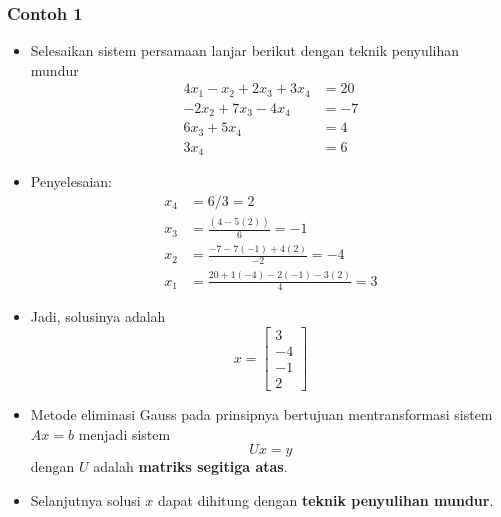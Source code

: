 \documentclass[pdflatex,compress,mathserif]{beamer}
\begin{document}
\begin{frame}
	\frametitle{Contoh 1}
	\begin{itemize}
		\item Selesaikan sistem persamaan lanjar berikut dengan teknik penyulihan mundur
		\begin{align*}
			4x_1 - x_2 + 2x_3 + 3x_4 &= 20 \\
			-2x_2 + 7x_3 - 4x_4 &= -7 \\
			6x_3 + 5x_4 &= 4 \\
			3x_4 &= 6
		\end{align*}
	\end{itemize}
\end{frame}

\begin{frame}
	\begin{itemize}
		\item Penyelesaian:
		\begin{align*}
		x_4 &= 6/3 = 2 \\
		x_3 &= \frac{(4-5(2))}{6} = -1 \\
		x_2 &= \frac{-7-7(-1)+4(2)}{-2} = -4 \\
		x_1 &= \frac{20 + 1(-4) - 2(-1)-3(2)}{4} = 3
		\end{align*}
		\item Jadi, solusinya adalah \[ x = \begin{bmatrix}
			3 \\ -4 \\ -1 \\ 2
		\end{bmatrix} \]
	\end{itemize}
\end{frame}

\begin{frame}
	\begin{itemize}
		\item Metode eliminasi Gauss pada prinsipnya bertujuan mentransformasi sistem $ Ax = b $ menjadi sistem \[ Ux = y \] dengan $ U $ adalah \textbf{matriks segitiga atas}.
		\item Selanjutnya solusi $ x $ dapat dihitung dengan \textbf{teknik penyulihan mundur}.
	\end{itemize}
\end{frame}
\end{document}
